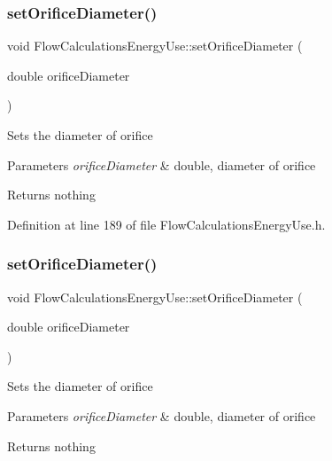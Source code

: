 \subsubsection{\texorpdfstring{set\+Orifice\+Diameter()}{setOrificeDiameter()}\hspace{0.1cm}{\footnotesize\ttfamily [2/3]}}
{\footnotesize\ttfamily void Flow\+Calculations\+Energy\+Use\+::set\+Orifice\+Diameter (\begin{DoxyParamCaption}\item[{double}]{orifice\+Diameter }\end{DoxyParamCaption})\hspace{0.3cm}{\ttfamily [inline]}}

Sets the diameter of orifice


\begin{DoxyParams}{Parameters}
{\em orifice\+Diameter} & double, diameter of orifice\\
\hline
\end{DoxyParams}
\begin{DoxyReturn}{Returns}
nothing 
\end{DoxyReturn}


Definition at line 189 of file Flow\+Calculations\+Energy\+Use.\+h.

\mbox{\label{class_flow_calculations_energy_use_a31116dc6381ad3fd9d2214da7ee3dd1b}} 
\subsubsection{\texorpdfstring{set\+Orifice\+Diameter()}{setOrificeDiameter()}\hspace{0.1cm}{\footnotesize\ttfamily [3/3]}}
{\footnotesize\ttfamily void Flow\+Calculations\+Energy\+Use\+::set\+Orifice\+Diameter (\begin{DoxyParamCaption}\item[{double}]{orifice\+Diameter }\end{DoxyParamCaption})\hspace{0.3cm}{\ttfamily [inline]}}

Sets the diameter of orifice


\begin{DoxyParams}{Parameters}
{\em orifice\+Diameter} & double, diameter of orifice\\
\hline
\end{DoxyParams}
\begin{DoxyReturn}{Returns}
nothing 
\end{DoxyReturn}


